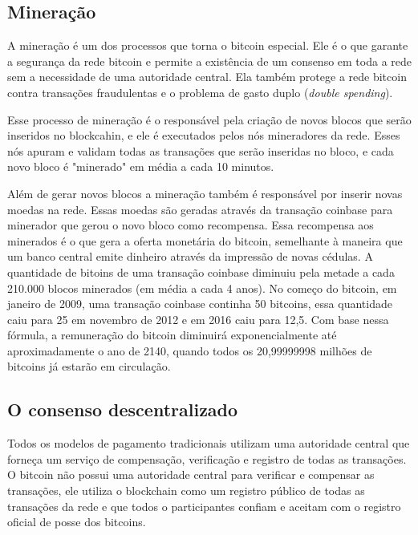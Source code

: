 \documentclass[conference,compsoc]{IEEEtran}
\begin{document}

 
\subsection{Mineração} 
A mineração é um dos processos que torna o bitcoin especial. Ele é o que garante a segurança da rede bitcoin e permite a existência de um consenso em toda a rede sem a necessidade de uma autoridade central. Ela também protege a rede bitcoin contra transações fraudulentas e o problema de gasto duplo (\textit{double spending}).

Esse processo de mineração é o responsável pela criação de novos blocos que serão inseridos no blockcahin, e ele é executados pelos nós mineradores da rede. Esses nós apuram e validam todas as transações que serão inseridas no bloco, e cada novo bloco é "minerado" em média a cada 10 minutos.

Além de gerar novos blocos a mineração também é responsável por inserir novas moedas na rede. Essas moedas são geradas através da transação coinbase para minerador que gerou o novo bloco como recompensa. Essa recompensa aos minerados é o que gera a oferta monetária do bitcoin, semelhante à maneira que um banco central emite dinheiro através da impressão de novas cédulas. A quantidade de bitoins de uma transação coinbase diminuiu pela metade a cada 210.000 blocos minerados (em média a cada 4 anos). No começo do bitcoin, em janeiro de 2009, uma transação coinbase continha 50 bitcoins, essa quantidade caiu para 25 em novembro de 2012 e em 2016 caiu para 12,5. Com base nessa fórmula, a remuneração do bitcoin diminuirá exponencialmente até aproximadamente o ano de 2140, quando todos os 20,99999998 milhões de bitcoins já estarão em circulação.

\subsection*{O consenso descentralizado}
Todos os modelos de pagamento tradicionais utilizam uma autoridade central que forneça um serviço de compensação, verificação e registro de todas as transações. O bitcoin não possui uma autoridade central para verificar e compensar as transações, ele utiliza o blockchain como um registro público de todas as transações da rede e que todos o participantes confiam e aceitam com o registro oficial de posse dos bitcoins.
\end{document}
